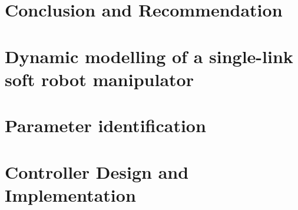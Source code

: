 \documentclass[11pt,twoside]{report}
\begin{document}
\chapter{Conclusion and Recommendation}

\cleardoublepage

%




\newpage
\begin{spacing}{1}

\end{spacing}

\cleardoublepage

\begin{appendices}

\chapter{Dynamic modelling of a single-link soft robot manipulator}

\cleardoublepage

\chapter{Parameter identification}

\cleardoublepage

\chapter{Controller Design and Implementation}

\cleardoublepage

%
\end{appendices}
\end{document}
